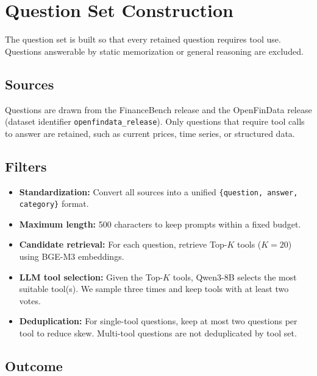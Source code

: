 \section{Question Set Construction}
\label{sec:questions}

The question set is built so that every retained question requires tool use.
Questions answerable by static memorization or general reasoning are excluded.

\subsection{Sources}

Questions are drawn from the FinanceBench release and the OpenFinData release (dataset identifier \texttt{openfindata\_}\allowbreak\texttt{release}).
Only questions that require tool calls to answer are retained, such as current prices, time series, or structured data.

\subsection{Filters}

\begin{itemize}[leftmargin=*,nosep]
\item \textbf{Standardization:} Convert all sources into a unified \texttt{\{question, answer, category\}} format.
\item \textbf{Maximum length:} 500 characters to keep prompts within a fixed budget.
\item \textbf{Candidate retrieval:} For each question, retrieve Top-$K$ tools ($K{=}20$) using BGE-M3 embeddings.
\item \textbf{LLM tool selection:} Given the Top-$K$ tools, Qwen3-8B selects the most suitable tool(s). We sample three times and keep tools with at least two votes.
\item \textbf{Deduplication:} For single-tool questions, keep at most two questions per tool to reduce skew. Multi-tool questions are not deduplicated by tool set.
\end{itemize}

\subsection{Outcome}

